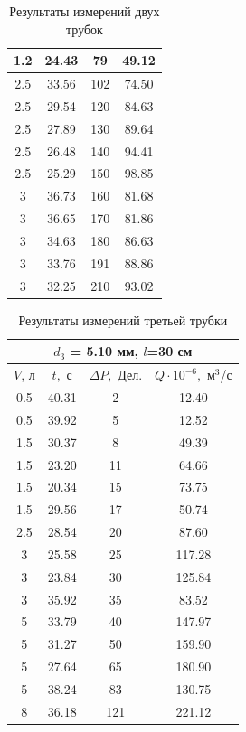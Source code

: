 \documentclass[a4paper]{article}
\begin{document}
\begin{table}[h!]
\begin{minipage}{.5\linewidth}
\begin{tabular}{|c|c|c|c|}
			1.2 & 24.43 & 79 & 49.12\\ \hline
			2.5 & 33.56 & 102 & 74.50 \\ \hline
			2.5 & 29.54 & 120 & 84.63 \\ \hline \hline
			2.5 & 27.89 & 130 & 89.64 \\ \hline
			2.5 & 26.48 & 140 & 94.41 \\ \hline
			2.5 & 25.29 & 150 &98.85 \\ \hline
			3 & 36.73 & 160 & 81.68 \\ \hline
			3 & 36.65 & 170 & 81.86 \\ \hline
			3 & 34.63 & 180 & 86.63 \\ \hline
			3 & 33.76 & 191 & 88.86 \\ \hline
			3 & 32.25 & 210 & 93.02 \\ \hline
			\end{tabular}
		\end{minipage}
	\egroup
\caption{Результаты измерений двух трубок}
\label{tab:measurements_12}
\end{table}  
\begin{table}[h!]
	\bgroup
	\def\arraystretch{1.0}%
	\centering
	\begin{minipage}{.5\linewidth}
		\centering
		\begin{tabular}{|c|c|c|c|}
			\hline
			\multicolumn{4}{|c|}{$d_3$ = 5.10 мм, $l$=30 см }\\ \hline
			$V$, $\text{л}$& $t,$ с&$\Delta P,$ Дел.  & $Q\cdot 10^{-6},$ $\text{м}^3$/с\\ \hline
			0.5 &40.31 & 2 & 12.40 \\ \hline
			0.5 & 39.92 & 5 & 12.52 \\ \hline
			1.5 & 30.37 & 8 & 49.39 \\ \hline
			1.5  & 23.20 & 11 & 64.66 \\ \hline
			1.5  & 20.34 & 15 & 73.75 \\ \hline
			1.5 & 29.56 & 17 & 50.74 \\ \hline
			2.5  & 28.54 & 20 & 87.60 \\ \hline
			3 & 25.58 & 25 & 117.28 \\ \hline \hline
			3 & 23.84 & 30 & 125.84 \\ \hline
			3 & 35.92 & 35 & 83.52 \\ \hline
			5 &33.79 & 40 & 147.97 \\ \hline
			5 & 31.27 & 50 & 159.90 \\ \hline
			5 & 27.64 & 65 & 180.90 \\ \hline
			5 & 38.24 & 83 & 130.75 \\ \hline
			8 & 36.18 & 121 & 221.12 \\ \hline
			\end{tabular}
		\end{minipage}
	\caption{Результаты измерений третьей трубки}
\label{tab:measurements_3}
\end{table}
\end{document}
